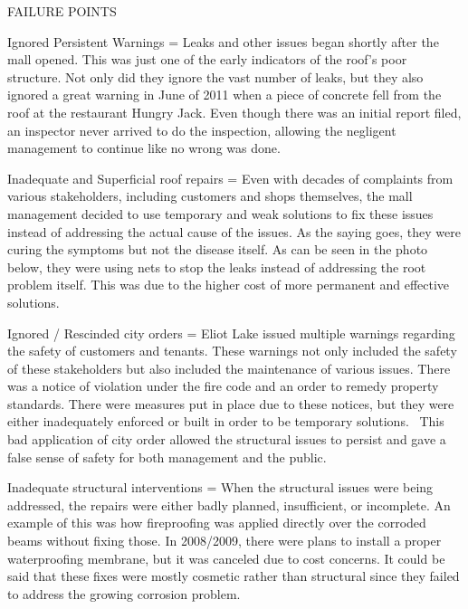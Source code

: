 \documentclass[12pt]{article}
\begin{document}

FAILURE POINTS

Ignored Persistent Warnings = Leaks and other issues began shortly after the mall opened. This was just one of the early indicators of the roof's poor structure. Not only did they ignore the vast number of leaks, but they also ignored a great warning in June of 2011 when a piece of concrete fell from the roof at the restaurant Hungry Jack. Even though there was an initial report filed, an inspector never arrived to do the inspection, allowing the negligent management to continue like no wrong was done. 
 
Inadequate and Superficial roof repairs = Even with decades of complaints from various stakeholders, including customers and shops themselves, the mall management decided to use temporary and weak solutions to fix these issues instead of addressing the actual cause of the issues. As the saying goes, they were curing the symptoms but not the disease itself. As can be seen in the photo below, they were using nets to stop the leaks instead of addressing the root problem itself. This was due to the higher cost of more permanent and effective solutions.
  

 

 
Ignored / Rescinded city orders = Eliot Lake issued multiple warnings regarding the safety of customers and tenants. These warnings not only included the safety of these stakeholders but also included the maintenance of various issues. There was a notice of violation under the fire code and an order to remedy property standards. There were measures put in place due to these notices, but they were either inadequately enforced or built in order to be temporary solutions.  This bad application of city order allowed the structural issues to persist and gave a false sense of safety for both management and the public. 

 

 

 
Inadequate structural interventions = When the structural issues were being addressed, the repairs were either badly planned, insufficient, or incomplete. An example of this was how fireproofing was applied directly over the corroded beams without fixing those. In 2008/2009, there were plans to install a proper waterproofing membrane, but it was canceled due to cost concerns. It could be said that these fixes were mostly cosmetic rather than structural since they failed to address the growing corrosion problem. 
\end{document}
